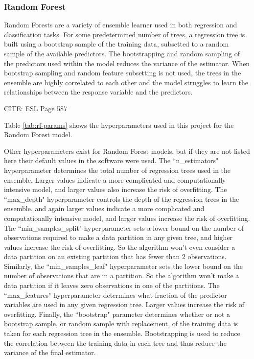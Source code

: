 \subsubsection*{Random Forest}

Random Forests are a variety of ensemble learner used in both regression and classification tasks. For some predetermined number of trees, a regression tree is built using a bootstrap sample of the training data, subsetted to a random sample of the available predictors. The bootstrapping and random sampling of the predictors used within the model reduces the variance of the estimator. When bootstrap sampling and random feature subsetting is not used, the trees in the ensemble are highly correlated to each other and the model struggles to learn the relationships between the response variable and the predictors. 

CITE: ESL Page 587

Table \ref{tab:rf-params} shows the hyperparameters used in this project for the Random Forest model.

Other hyperparameters exist for Random Forest models, but if they are not listed here their default values in the software were used. The ``n\_estimators" hyperparameter determines the total number of regression trees used in the ensemble. Larger values indicate a more complicated and computationally intensive model, and larger values also increase the risk of overfitting. The ``max\_depth" hyperparameter controls the depth of the regression trees in the ensemble, and again larger values indicate a more complicated and computationally intensive model, and larger values increase the risk of overfitting. The ``min\_samples\_split" hyperparameter sets a lower bound on the number of observations required to make a data partition in any given tree, and higher values increase the risk of overfitting. So the algorithm won't even consider a data partition on an existing partition that has fewer than 2 observations. Similarly, the ``min\_samples\_leaf" hyperparameter sets the lower bound on the number of observations that are in a partition. So the algorithm won't make a data partition if it leaves zero observations in one of the partitions. The ``max\_features" hyperparameter determines what fraction of the predictor variables are used in any given regression tree. Larger values increase the risk of overfitting. Finally, the ``bootstrap" parameter determines whether or not a bootstrap sample, or random sample with replacement, of the training data is taken for each regression tree in the ensemble. Bootstrapping is used to reduce the correlation between the training data in each tree and thus reduce the variance of the final estimator. 

